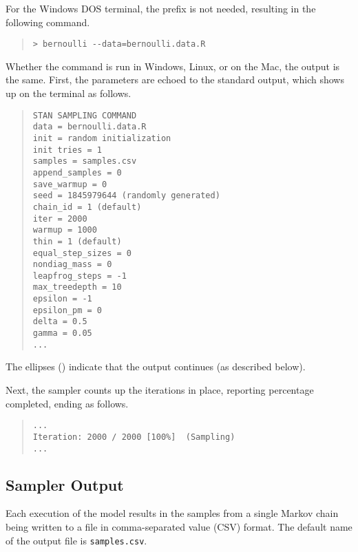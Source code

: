 For the Windows DOS terminal, the  prefix is not needed,
resulting in the following command.
%
\begin{quote}
\begin{Verbatim}[fontshape=sl]
> bernoulli --data=bernoulli.data.R
\end{Verbatim}
\end{quote}
%
Whether the command is run in Windows, Linux, or on the Mac, the
output is the same.  First, the parameters are echoed to the standard output,
which shows up on the terminal as follows.
%
\begin{quote}
\begin{Verbatim}
STAN SAMPLING COMMAND
data = bernoulli.data.R
init = random initialization
init tries = 1
samples = samples.csv
append_samples = 0
save_warmup = 0
seed = 1845979644 (randomly generated)
chain_id = 1 (default)
iter = 2000
warmup = 1000
thin = 1 (default)
equal_step_sizes = 0
nondiag_mass = 0
leapfrog_steps = -1
max_treedepth = 10
epsilon = -1
epsilon_pm = 0
delta = 0.5
gamma = 0.05
...
\end{Verbatim}
\end{quote}
%
The ellipses () indicate that the output continues (as
described below).

Next, the sampler counts up the iterations in place, reporting
percentage completed, ending as follows.
%
\begin{quote}
\begin{Verbatim}
...
Iteration: 2000 / 2000 [100%]  (Sampling)
...
\end{Verbatim}
\end{quote}

\subsection{Sampler Output}

Each execution of the model results in the samples from a single
Markov chain being written to a file in comma-separated value (CSV) format.
The default name of the output file is \nolinkurl{samples.csv}.

